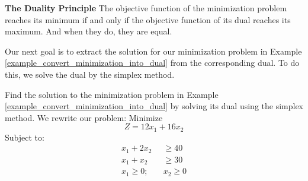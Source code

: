 \begin{definition}
    \textbf{The Duality Principle}
    The objective function of the minimization problem reaches its minimum if and only if the objective function of its dual reaches its maximum.  And when they do, they are equal.
\end{definition}

Our next goal is to extract the solution for our minimization problem in Example \ref{example_convert_minimization_into_dual} from the corresponding dual. To do this, we solve the dual by the simplex method.

\begin{example}
    Find the solution to the minimization problem in Example \ref{example_convert_minimization_into_dual} by solving its dual using the simplex method. We rewrite our problem:
    Minimize
    \[ Z = 12x_1 + 16x_2 \]
    Subject to:
    \begin{align*}
        x_1 + 2x_2        & \geq 40    \\
        x_1 + x_2         & \geq 30    \\
        x_1 \geq 0; \quad & x_2 \geq 0
    \end{align*}
\end{example}

